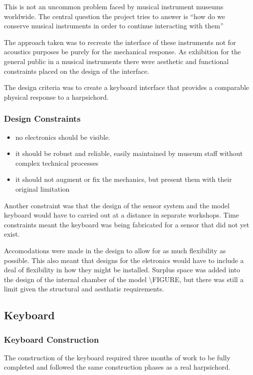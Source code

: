 This is not an uncommon problem faced by musical instrument museums
worldwide. The central question the project tries to answer is ``how do
we conserve musical instruments in order to continue interacting with
them''

The approach taken was to recreate the interface of these instruments
not for acoustics purposes be purely for the mechanical response. As
exhibition for the general public in a musical instruments there were
aesthetic and functional constraints placed on the design of the
interface.

The design criteria was to create a keyboard interface that provides a
comparable physical response to a harpsichord.

\subsubsection{Design Constraints}\label{design-constraints}

\begin{itemize}
\item
  no electronics should be visible.
\item
  it should be robust and reliable, easily maintained by museum staff
  without complex technical processes
\item
  it should not augment or fix the mechanics, but present them with
  their original limitation
\end{itemize}

Another constraint was that the design of the sensor system and the
model keyboard would have to carried out at a distance in separate
workshops. Time constraints meant the keyboard was being fabricated for
a sensor that did not yet exist.

Accomodations were made in the design to allow for as much flexibility
as possible. This also meant that designs for the eletronics would have
to include a deal of flexibility in how they might be installed. Surplus
space was added into the design of the internal chamber of the model
\textbackslash FIGURE, but there was still a limit given the structural
and aesthatic requirements.

\subsection{Keyboard}\label{keyboard}

\subsubsection{Keyboard Construction}\label{keyboard-construction}
The construction of the keyboard required three months of work to be fully completed
and followed the same construction phases as a real harpsichord.

